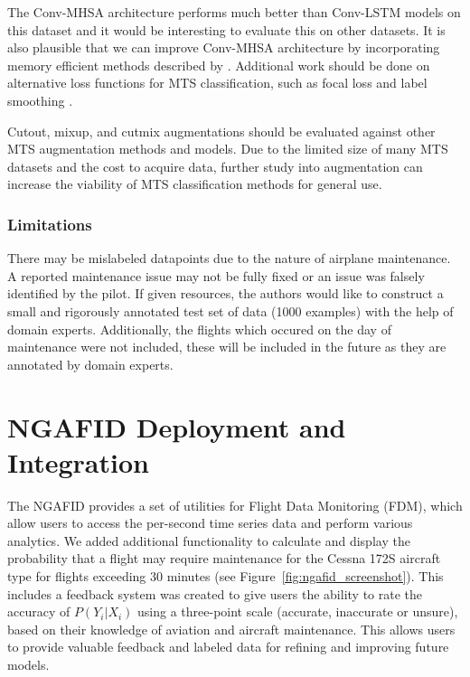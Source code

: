 \documentclass[letterpaper]{article} %
\begin{document}
The Conv-MHSA architecture performs much better than Conv-LSTM models on this dataset and it would be interesting to evaluate this on other datasets. It is also plausible that we can improve Conv-MHSA architecture by incorporating memory efficient methods described by \cite{kitaev2020reformer}. Additional work should be done on alternative loss functions for MTS classification, such as focal loss \cite{lin2017focal} and label smoothing \cite{szegedy2016rethinking}.

Cutout, mixup, and cutmix augmentations should be evaluated against other MTS augmentation methods and models. Due to the limited size of many MTS datasets and the cost to acquire data, further study into augmentation can increase the viability of MTS classification methods for general use.

\subsubsection{Limitations}

There may be mislabeled datapoints due to the nature of airplane maintenance.  A reported maintenance issue may not be fully fixed or an issue was falsely identified by the pilot. If given resources, the authors would like to construct a small and rigorously annotated test set of data (1000 examples) with the help of domain experts. Additionally, the flights which occured on the day of maintenance were not included, these will be included in the future as they are annotated by domain experts.

\section{NGAFID Deployment and Integration}









The NGAFID provides a set of utilities for Flight Data Monitoring (FDM), which allow users to access the per-second time series data and perform various analytics. We added additional functionality to calculate and display the probability that a flight may require maintenance for the Cessna 172S aircraft type for flights exceeding 30 minutes (see Figure~\ref{fig:ngafid_screenshot}). This includes a feedback system was created to give users the ability to rate the accuracy of $P(Y_i|X_i)$ using a three-point scale (accurate, inaccurate or unsure), based on their knowledge of aviation and aircraft maintenance. This allows users to provide valuable feedback and labeled data for refining and improving future models.
\end{document}

